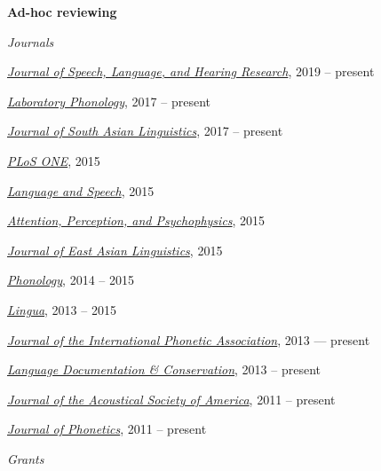 \documentclass[10pt]{article}
\newcommand{\blankline}{\quad\pagebreak[3]}
\begin{document}
\blankline

\textbf{Ad-hoc reviewing}

\begin{outerlist}

    \item[] \textit{Journals}%

      \begin{innerlist}
      \item
        \href{http://www.journal-labphon.org/}{\emph{Journal of Speech, Language, and Hearing Research}}, 2019 -- present
      \item
        \href{http://www.journal-labphon.org/}{\emph{Laboratory Phonology}}, 2017 -- present
      \item
        \href{http://jsal-journal.org/}{\emph{Journal of South Asian Linguistics}}, 2017 -- present
      \item
        \href{http://www.plosone.org/}{\emph{PLoS ONE}}, 2015
      \item
        \href{http://las.sagepub.com}{\emph{Language
            and Speech}}, 2015
      \item
        \href{http://www.springer.com/psychology/cognitive+psychology/journal/13414}{\emph{Attention,
            Perception, and Psychophysics}}, 2015
      \item
        \href{http://link.springer.com/journal/10831}{\emph{Journal of East Asian Linguistics}},
        2015
      \item
        \href{http://journals.cambridge.org/action/displayJournal?jid=PHO}{\emph{Phonology}},
        2014 -- 2015
      \item \href{http://www.journals.elsevier.com/lingua/}{\emph{Lingua}}, 2013 -- 2015
        \item
          \href{http://journals.cambridge.org/action/displayJournal?jid=IPA}{\emph{Journal
              of the International Phonetic Association}}, 2013 --- present
        \item \href{http://nflrc.hawaii.edu/ldc/}{\emph{Language Documentation \& Conservation}}, 2013 -- present
        \item \href{http://asadl.org/jasa/}{\emph{Journal of the Acoustical Society of America}}, 2011 -- present
        \item \href{http://www.journals.elsevier.com/journal-of-phonetics/}{\emph{Journal of Phonetics}}, 2011 -- present
      \end{innerlist}

    \item[] \textit{Grants}%


\end{outerlist}
\end{document}
